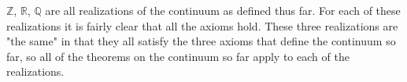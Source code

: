 \documentclass[12pt]{article}
\renewcommand{\_}[1]{\underline{ #1 }}
\theoremstyle{definition}
\numberwithin{equation}{subsection}
\begin{document}
$\mathbb Z$, $\mathbb R$, $\mathbb Q$ are all realizations of the continuum as defined thus far. For each of these realizations it is fairly clear that all the axioms hold. These three realizations are "the same" in that they all satisfy the three axioms that define the continuum so far, so all of the theorems on the continuum so far apply to each of the realizations.
\end{document}
